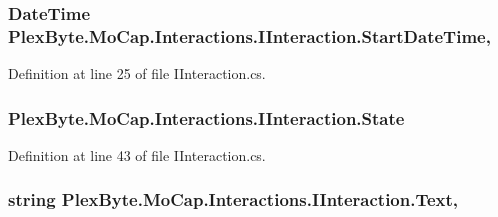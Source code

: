 \subsubsection[{\texorpdfstring{Start\+Date\+Time}{StartDateTime}}]{\setlength{\rightskip}{0pt plus 5cm}Date\+Time Plex\+Byte.\+Mo\+Cap.\+Interactions.\+I\+Interaction.\+Start\+Date\+Time\hspace{0.3cm}{\ttfamily [get]}, {\ttfamily [set]}}\hypertarget{interface_plex_byte_1_1_mo_cap_1_1_interactions_1_1_i_interaction_ad7cb75815bcac172e1944418ec2e7e33}{}\label{interface_plex_byte_1_1_mo_cap_1_1_interactions_1_1_i_interaction_ad7cb75815bcac172e1944418ec2e7e33}


Definition at line 25 of file I\+Interaction.\+cs.

\subsubsection[{\texorpdfstring{State}{State}}]{ Plex\+Byte.\+Mo\+Cap.\+Interactions.\+I\+Interaction.\+State\hspace{0.3cm}{\ttfamily [get]}}\hypertarget{interface_plex_byte_1_1_mo_cap_1_1_interactions_1_1_i_interaction_a149f0058af52987cef67f429ba756d01}{}\label{interface_plex_byte_1_1_mo_cap_1_1_interactions_1_1_i_interaction_a149f0058af52987cef67f429ba756d01}


Definition at line 43 of file I\+Interaction.\+cs.

\subsubsection[{\texorpdfstring{Text}{Text}}]{\setlength{\rightskip}{0pt plus 5cm}string Plex\+Byte.\+Mo\+Cap.\+Interactions.\+I\+Interaction.\+Text\hspace{0.3cm}{\ttfamily [get]}, {\ttfamily [set]}}\hypertarget{interface_plex_byte_1_1_mo_cap_1_1_interactions_1_1_i_interaction_ab92e9fa8ce447f0468bd4e1fdce4f851}{}\label{interface_plex_byte_1_1_mo_cap_1_1_interactions_1_1_i_interaction_ab92e9fa8ce447f0468bd4e1fdce4f851}


